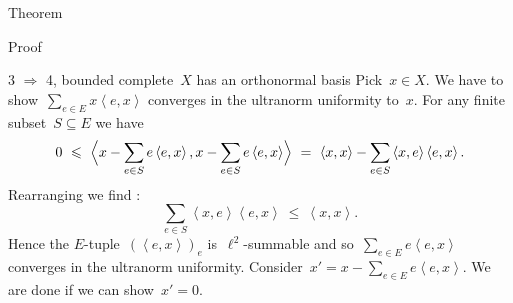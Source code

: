 \begin{parsec}
\begin{point}{Theorem}
\begin{point}{Proof}
\begin{point}{3
    $\Rightarrow$ 4, bounded complete~$X$ has an orthonormal basis}
Pick~$x \in X$.
We have to show~$\sum_{e \in E} x\left<e,x\right>$
converges in the ultranorm uniformity to~$x$.
For any finite subset~$S \subseteq E$ we have
\begin{equation*}
    0\  \leq\  \Bigl< x - \sum_{e \in S} e\left<e,x\right>,
        x - \sum_{e \in S} e\left<e,x\right> \Bigr>
       \  =\  \left<x,x\right> - \sum_{e \in S} \left<x,e\right>\left<e,x\right>.
\end{equation*}
Rearranging we find :
\begin{equation*}
\sum_{e \in S} \left<x,e\right>\left<e,x\right>
   \  \leq \ \left<x,x\right>.
\end{equation*}
Hence the $E$-tuple~$(\left<e,x\right>)_e$
is~$\ell^2$-summable
and so~$\sum_{e \in E} e \left<e,x\right>$
converges in the ultranorm uniformity.
Consider~$x' = x - \sum_{e \in E} e\left<e,x\right>$.
We are done if we can show~$x' = 0$.


\end{point}
\end{point}
\end{point}
\end{parsec}
